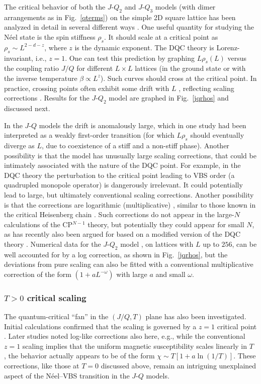 \documentclass[range]{ar2e}
\begin{document}
The critical behavior of both the $J$-$Q_2$ and $J$-$Q_3$ models (with dimer arrangements as in Fig.~\ref{qterms}) on the simple 2D square 
lattice has been analyzed in detail in several different ways \cite{Sandvik07,Jiang08,kaul2008:jqlgN,melko2008:jq,lou2009:sun,Sandvik10c}. One useful quantity 
for studying the N\'eel state is the spin stiffness $\rho_s$. It should scale at a critical point as $\rho_s \sim L^{2-d-z}$, 
where $z$ is the dynamic exponent. The DQC theory is Lorenz-invariant, i.e., $z=1$. One can test this prediction by graphing 
$L\rho_s(L)$ versus the coupling ratio $J/Q$ for different $L\times L$ lattices (in the ground state or with the inverse temperature $\beta \propto L^z$). 
Such curves should cross at the critical point. In practice, crossing points often exhibit some drift with $L$ \cite{melko2008:jq}, reflecting scaling 
corrections \cite{Sandvik10c}. Results for the $J$-$Q_2$ model are graphed in Fig.~\ref{jqrhos} and discussed next.

In the $J$-$Q$ models the drift is anomalously large, which in one study \cite{Jiang08} had been interpreted as a weakly first-order transition (for which 
$L\rho_s$ should eventually diverge as $L$, due to coexistence of a stiff and a non-stiff phase). Another possibility is that the model has unusually
large scaling corrections, that could be intimately associated with the nature of the DQC point. For example, in the DQC theory the perturbation to the 
critical point leading to VBS order (a quadrupled monopole operator) is dangerously irrelevant. It could potentially lead to large, but ultimately conventional
scaling corrections. Another possibility is that the corrections are logarithmic (multiplicative) \cite{Sandvik10c,banerjee2010:log}, similar to those known 
in the critical Heisenberg chain \cite{Giamarchi89}. Such corrections do not appear in the large-$N$ calculations of the CP$^{N-1}$ theory, but potentially they could 
appear for small $N$, as has recently also been argued for based on a modified version of the DQC theory \cite{Nogueira11}. Numerical data for the $J$-$Q_2$ 
model \cite{Sandvik10c}, on lattices with $L$ up to $256$, can be well accounted for by a log correction, as shown in Fig.~\ref{jqrhos}, but the 
deviations from pure scaling can also be fitted with a conventional multiplicative correction of the form $(1+aL^{-\omega})$ with large $a$ and small $\omega$.

\subsubsection{$T>0$ critical scaling} The quantum-critical ``fan'' in the $(J/Q,T)$ plane has also been investigated. Initial calculations confirmed that
the scaling is governed by a $z=1$ critical point \cite{melko2008:jq}. Later studies \cite{Sandvik10c,Sandvik11a} noted log-like corrections also here, e.g., 
while the conventional $z=1$ scaling implies that the uniform magnetic susceptibility scales linearly in $T$ \cite{Chakravarty89}, the behavior actually appears 
to be of the form $\chi \sim T[1+a\ln(1/T)]$. These corrections, like those at $T=0$ discussed above, remain an intriguing unexplained aspect of the N\'eel--VBS 
transition in the $J$-$Q$ models.
\end{document}
